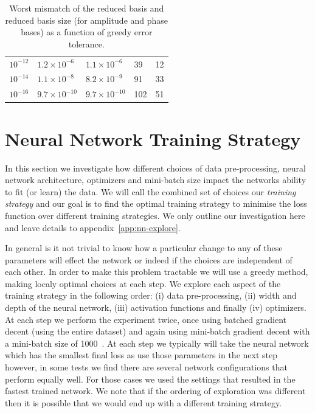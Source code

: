 \documentclass[aps,prd,reprint,superscriptaddress,preprintnumbers,showpacs,nofootinbib]{revtex4-1}
\begin{document}
\begin{table}[]
\begin{tabular}{lllll}
$10^{-12}$                                                                     & $1.2 \times 10^{-6}$              & $1.1 \times 10^{-6}$                & 39                                                                                & 12                                                                            \\
$10^{-14}$                                                                     & $1.1 \times 10^{-8}$              & $8.2 \times 10^{-9}$                & 91                                                                                & 33                                                                            \\
$10^{-16}$                                                                     & $9.7 \times 10^{-10}$             & $9.7 \times 10^{-10}$               & 102                                                                               & 51                                                                            \\ \hline
\end{tabular}
\caption{Worst mismatch of the reduced basis and reduced basis size (for amplitude and phase bases) as a function of greedy error tolerance.}
\label{tab:tol}
\end{table}

\section{Neural Network Training Strategy}
\label{sec:nnts}

In this section we investigate how different choices of data pre-processing,
neural network architecture, optimizers and mini-batch size impact the networks
ability to fit (or learn) the data. We will call the combined set of choices our
\emph{training strategy} and our goal is to find the optimal training strategy
to minimise the loss function over different training strategies. We only
outline our investigation here and leave details to
appendix~\ref{app:nn-explore}.

In general is it not trivial to know how a particular change to any of these
parameters will effect the network or indeed if the choices are independent of
each other. In order to make this problem tractable we will use a greedy method,
making localy optimal choices at each step. We explore each aspect of the
training strategy in the following order: (i) data pre-processing, (ii) width
and depth of the neural network, (iii) activation functions and finally (iv)
optimizers. At each step we perform the experiment twice, once using batched
gradient decent (using the entire dataset) and again using mini-batch gradient
decent with a mini-batch size of 1000~\cite{10.5555/3086952}. At each step we
typically will take the neural network which has the smallest final loss as use
those parameters in the next step however, in some tests we find there are
several network configurations that perform equally well. For those cases we
used the settings that resulted in the fastest trained network. We note that if
the ordering of exploration was different then it is possible that we would end
up with a different training strategy.
\end{document}
